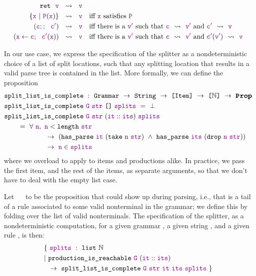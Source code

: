     \begin{align*}
      \texttt{ret}~~\textcolor{violet}{\texttt{v}}&~~\rightsquigarrow~~\textcolor{violet}{\texttt{v}} \\
      \{\textcolor{violet}{\texttt{x}}~|~\textcolor{violet}{\texttt{P}}(\textcolor{violet}{\texttt{x}})\}&~~\rightsquigarrow~~\textcolor{violet}{\texttt{v}}\quad\text{iff \textcolor{violet}{\texttt{x}} satisfies \textcolor{violet}{\texttt{P}}} \\
      (\textcolor{violet}{\texttt{c}};;~~\textcolor{violet}{\texttt{c$'$}})&~~\rightsquigarrow~~\textcolor{violet}{\texttt{v}}\quad\text{iff there is a \textcolor{violet}{\texttt{v$'$}} such that \textcolor{violet}{\texttt{c}}~~\ensuremath{\rightsquigarrow}~~\textcolor{violet}{\texttt{v$'$}} and \textcolor{violet}{\texttt{c$'$}}~~\ensuremath{\rightsquigarrow}~~\textcolor{violet}{\texttt{v}}} \\
      (\textcolor{violet}{\texttt{x}} \leftarrow \textcolor{violet}{\texttt{c}};~~\textcolor{violet}{\texttt{c$'$}}(\textcolor{violet}{\texttt{x}}))&~~\rightsquigarrow~~\textcolor{violet}{\texttt{v}}\quad\text{iff there is a \textcolor{violet}{\texttt{v$'$}} such that \textcolor{violet}{\texttt{c}}~~\ensuremath{\rightsquigarrow}~~\textcolor{violet}{\texttt{v$'$}} and \textcolor{violet}{\texttt{c$'$}}(\textcolor{violet}{\texttt{v$'$}})~~\ensuremath{\rightsquigarrow}~~\textcolor{violet}{\texttt{v}}}
    \end{align*}
    
    In our use case, we express the specification of the splitter as a nondeterministic choice of a list of split locations, such that any splitting location that results in a valid parse tree is contained in the list.  More formally, we can define the proposition
\begin{align*}
  &\fname{split\_list\_is\_complete} ~:~\indname{Grammar}~\to~\indname{String}~\to~\typelist{\indname{Item}}~\to~\typelist{\mathbb{N}}~\to~\Prop \\
  &\fname{split\_list\_is\_complete}~\farg{G}~\farg{str}~\nil~\farg{splits}~=~\False \\
  &\fname{split\_list\_is\_complete} ~\farg{G}~\farg{str}~(\cons{\farg{it}}{\farg{its}}) ~\farg{splits} \\
  &\qquad=~\forall~\farg{n},~\farg{n}<\fname{length}~\farg{str} \\
  &\qquad\qquad\qquad\to~(\fname{has\_parse}~\farg{it}~(\fname{take}~\farg{n}~\farg{str})~\wedge~\fname{has\_parse}~\farg{its}~(\fname{drop}~\farg{n}~\farg{str})) \\
  &\qquad\qquad\qquad\to~\farg{n}\in\farg{splits}
\end{align*}
    where we overload  to apply to items and productions alike.  In practice, we pass the first item, and the rest of the items, as separate arguments, so that we don't have to deal with the empty list case.
    
    Let ~~ to be the proposition that  could show up during parsing, i.e., that  is a tail of a rule associated to some valid nonterminal in the grammar; we define this by folding over the list of valid nonterminals.  The specification of the splitter, as a nondeterministic computation, for a given grammar , a given string , and a given rule , is then:
\begin{align*}
& \{~\textcolor{violet}{\texttt{splits}}~:~\texttt{list}~{\mathbb{N}} \\
& |~\texttt{production\_is\_reachable}~\textcolor{violet}{\texttt{G}}~(\textcolor{violet}{\texttt{it}}::\textcolor{violet}{\texttt{its}})\\
&\phantom{|~}\to~\texttt{split\_list\_is\_complete}~\textcolor{violet}{\texttt{G}}~\textcolor{violet}{\texttt{str}}~\textcolor{violet}{\texttt{it}}~\textcolor{violet}{\texttt{its}}~\textcolor{violet}{\texttt{splits}}~\}
\end{align*}
    
